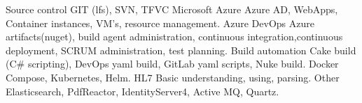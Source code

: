
\begin{cvskills}
  
\cvskill
{Source control} %
{GIT (lfs), SVN, TFVC} %
\cvskill
{Microsoft Azure} %
{Azure AD, WebApps, Container instances, VM's, resource management.} %
\cvskill
{Azure DevOps} %
{Azure artifacts(nuget), build agent administration, continuous integration,\newline continuous deployment, SCRUM administration, test planning.} %
\cvskill
{Build automation} %
{Cake build (C\# scripting), DevOps yaml build, GitLab yaml scripts, Nuke build.} %
\cvskill
{Docker} %
{Compose, Kubernetes, Helm.} %
\cvskill
{HL7} %
{Basic understanding, using, parsing.} %
\cvskill
{Other} %
{Elasticsearch, PdfReactor, IdentityServer4, Active MQ, Quartz.} %

\end{cvskills}